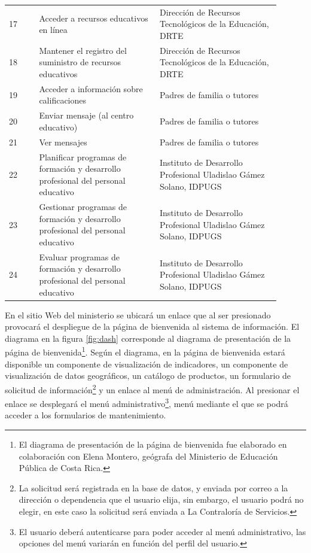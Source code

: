 \documentclass{article}
\begin{document}
\begin{multicols}{6}[]
\begin{center}
\begin{tabular}{p{0.1\linewidth}p{0.4\linewidth}p{0.4\linewidth}}
		17 & Acceder a recursos educativos en l\'inea & Direcci\'on de Recursos Tecnol\'ogicos de la Educaci\'on, DRTE \\
		18 & Mantener el registro del suministro de recursos educativos & Direcci\'on de Recursos Tecnol\'ogicos de la Educaci\'on, DRTE \\
		19 & Acceder a informaci\'on sobre calificaciones & Padres de familia o tutores \\
		20 & Enviar mensaje (al centro educativo) & Padres de familia o tutores \\
		21 & Ver mensajes & Padres de familia o tutores \\
		22 & Planificar programas de formaci\'on y desarrollo profesional del personal educativo & Instituto de Desarrollo Profesional Uladislao G\'amez Solano, IDPUGS \\
		23 & Gestionar programas de formaci\'on y desarrollo profesional del personal educativo & Instituto de Desarrollo Profesional Uladislao G\'amez Solano, IDPUGS \\
		24 & Evaluar programas de formaci\'on y desarrollo profesional del personal educativo & Instituto de Desarrollo Profesional Uladislao G\'amez Solano, IDPUGS
	\end{tabular}
\end{center}

En el sitio Web del ministerio se ubicar\'a un enlace que al ser presionado provocar\'a el despliegue de la p\'agina de bienvenida al sistema de informaci\'on. El diagrama en la figura \ref{fig:dash} corresponde al diagrama de presentaci\'on de la p\'agina de bienvenida\footnote{El diagrama de presentaci\'on de la p\'agina de bienvenida fue elaborado en colaboraci\'on con Elena Montero, ge\'ografa del Ministerio de Educaci\'on P\'ublica de Costa Rica.}. Seg\'un el diagrama, en la p\'agina de bienvenida estar\'a disponible un componente de visualizaci\'on de indicadores, un componente de visualizaci\'on de datos geogr\'aficos, un cat\'alogo de productos, un formulario de solicitud de informaci\'on\footnote{La solicitud ser\'a registrada en la base de datos, y enviada por correo a la direcci\'on o dependencia que el usuario elija, sin embargo, el usuario podr\'a no elegir, en este caso la solicitud ser\'a enviada a La Contralor\'ia de Servicios.} y un enlace al men\'u de administraci\'on. Al presionar el enlace se desplegar\'a el men\'u administrativo\footnote{El usuario deber\'a autenticarse para poder acceder al men\'u administrativo, las opciones del men\'u variar\'an en funci\'on del perfil del usuario.}, men\'u mediante el que se podr\'a acceder a los formularios de mantenimiento.


\end{multicols}
\end{document}
